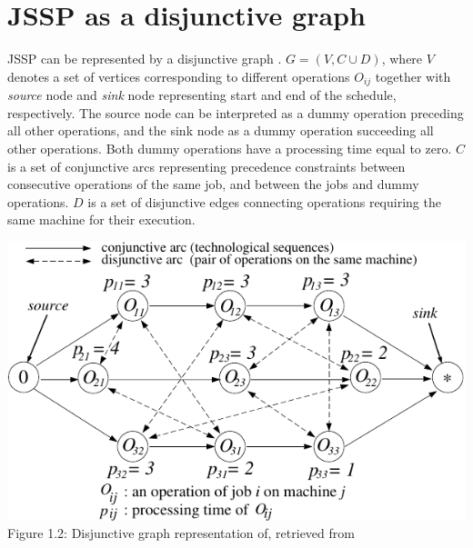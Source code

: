 \section{JSSP as a disjunctive graph}

JSSP can be represented by a disjunctive graph \cite{YamadaNakanoJSSP, BLAZEWICZ2000317}. $ G = ( V, C \cup D )$, where $V$ denotes a set of vertices corresponding to different operations $O_{ij}$ together with \textit{source} node and \textit{sink} node representing start and end of the schedule, respectively. The source node can be interpreted as a dummy operation preceding all other operations, and the sink node as a dummy operation succeeding all other operations. Both dummy operations have a processing time equal to zero. $C$ is a set of conjunctive arcs representing precedence constraints between consecutive operations of the same job, and between the jobs and dummy operations. $D$ is a set of disjunctive edges connecting operations requiring the same machine for their execution.
\begin{center}
    \includegraphics[width=0.8\linewidth]{images/jssp_disjunctive_graph.pdf}\\
    Figure 1.2: Disjunctive graph representation of, retrieved from \cite{YamadaNakanoJSSP}
\end{center}

